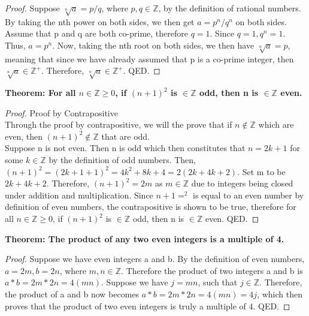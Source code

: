 \begin{proof}
    Suppose $\sqrt[n]{a} = p/q$, where $p,q \in \mathbb{Z}$, by the definition of rational numbers. By taking the nth power on both sides, we then get $a=p^n/q^n$ on both sides. Assume that p and q are both co-prime, therefore $q=1$. Since $q=1, q^n=1$. Thus, $a = p^n$. Now, taking the nth root on both sides, we then have $\sqrt[n]{a}=p$, meaning that since we have already assumed that p is a co-prime integer, then $\sqrt[n]{a} \in \mathbb{Z}^+$. Therefore, $\sqrt[n]{a} \in \mathbb{Z}^+$. QED.
\end{proof}

\newpage

\begin{example}
\textbf{Theorem: For all $n \in \mathbb{Z} \geq 0$, if $(n+1)^2$ is $\in \mathbb{Z}$ odd, then n is $\in \mathbb{Z}$ even.}
\end{example}

\begin{proof}
    Proof by Contrapositive\\
    Through the proof by contrapositive, we will the prove that if $n \notin \mathbb{Z}$ which are even, then $(n+1)^2 \notin \mathbb{Z}$ that are odd.\\
    Suppose n is not even. Then n is odd which then constitutes that $n=2k+1$ for some $k \in \mathbb{Z}$ by the definition of odd numbers. Then, $(n+1)^2=(2k+1+1)^2=4k^2+8k+4=2(2k+4k+2)$. Set m to be $2k+4k+2$. Therefore, $(n+1)^2=2m$ as $m \in \mathbb{Z}$ due to integers being closed under addition and multiplication. Since $n+1=^2$ is equal to an even number by definition of even numbers, the contrapositive is shown to be true, therefore for all $n \in \mathbb{Z} \geq 0$, if $(n+1)^2$ is $\in \mathbb{Z}$ odd, then n is $\in \mathbb{Z}$ even. QED.
\end{proof}

\begin{example}
    \textbf{Theorem: The product of any two even integers is a multiple of 4.}
\end{example}

\begin{proof}
    Suppose we have even integers a and b. By the definition of even numbers, $a = 2m, b = 2n$, where $m, n \in \mathbb{Z}$. Therefore the product of two integers a and b is $a * b = 2m * 2n = 4(mn)$. Suppose we have $j = mn$, such that $j \in \mathbb{Z}$. Therefore, the product of a and b now becomes $a * b = 2m * 2n = 4(mn) = 4j$, which then proves that the product of two even integers is truly a multiple of 4. QED.
\end{proof}

